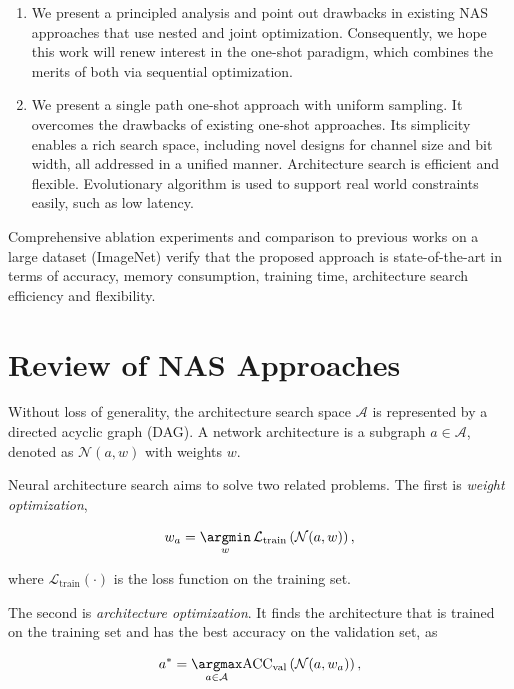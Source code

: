 \begin{enumerate}
    \item We present a principled analysis and point out drawbacks in existing NAS approaches that use nested and joint optimization. Consequently, we hope this work will renew interest in the one-shot paradigm, which combines the merits of both via sequential optimization.

    \item We present a single path one-shot approach with uniform sampling. It overcomes the drawbacks of existing one-shot approaches. Its simplicity enables a rich search space, including novel designs for channel size and bit width, all addressed in a unified manner. Architecture search is efficient and flexible. Evolutionary algorithm is used to support real world constraints easily, such as low latency.
\end{enumerate}

Comprehensive ablation experiments and comparison to previous works on a large dataset (ImageNet) verify that the proposed approach is state-of-the-art in terms of accuracy, memory consumption, training time, architecture search efficiency and flexibility.

\section{Review of NAS Approaches}
\label{sec:review_NAS}

Without loss of generality, the architecture search space $\mathcal{A}$ is represented by a directed acyclic graph (DAG). A network architecture is a subgraph $a\in\mathcal{A}$, denoted as $\mathcal{N}(a, w)$ with weights $w$.

Neural architecture search aims to solve two related problems. The first is \emph{weight optimization},

\begin{equation}

    w_a = \mathop{\argmin}_{w} \mathcal{L}_\text{train} \left( \mathcal{N}(a, w) \right),
\label{equ:subprob_weight}
\end{equation}

where $\mathcal{L}_\text{train}(\cdot)$ is the loss function on the training set.

The second is \emph{architecture optimization}. It finds the architecture that is trained on the training set and has the best accuracy on the validation set, as

\begin{equation}
\begin{split}
    a^* = \mathop{\argmax}_{a\in \mathcal{A}} & \text{ACC}_\text{val} \left( \mathcal{N}(a, w_a) \right), \\

\end{split}
\label{equ:subprob_arch}
\end{equation}

